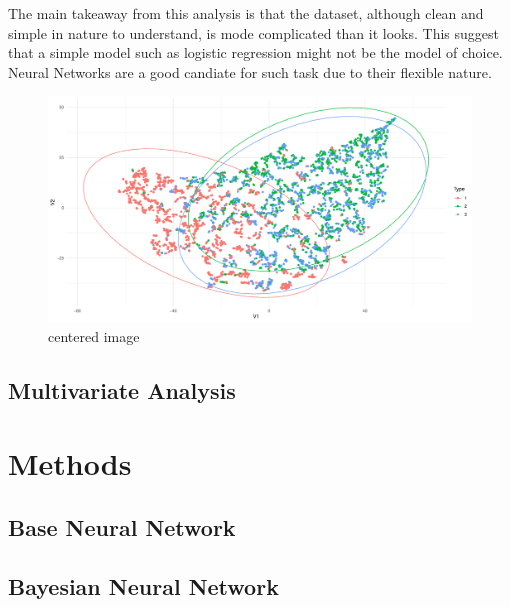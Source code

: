 \documentclass[11pt,twoside]{article}
\numberwithin{Theorem}{section}
\numberwithin{Definition}{section}
\numberwithin{Lemma}{section}
\numberwithin{Algorithm}{section}
\numberwithin{equation}{section}
\begin{document}
The main takeaway from this analysis is that the dataset, although clean and simple in nature to understand, is mode complicated than it looks. This suggest that a simple model such as logistic regression might not be the model of choice. Neural Networks are a good candiate for such task due to their flexible nature. 

\vspace*{1em}
\begin{figure}[!h]
\centering
\includegraphics[width=\textwidth]{./output/1.d.t-sne.pdf}
\caption{centered image}
\label{fig:sne_biplot}
\end{figure}
\vspace{2em}


\subsection{Multivariate Analysis}
\label{sec:multivariate}
\blindtext


\clearpage


\section{Methods}
\label{sec:methods}
\blindtext

\subsection{Base Neural Network}
\label{sec:NN}
\blindtext

\subsection{Bayesian Neural Network}
\label{sec:BNN}
\blindtext
\end{document}
